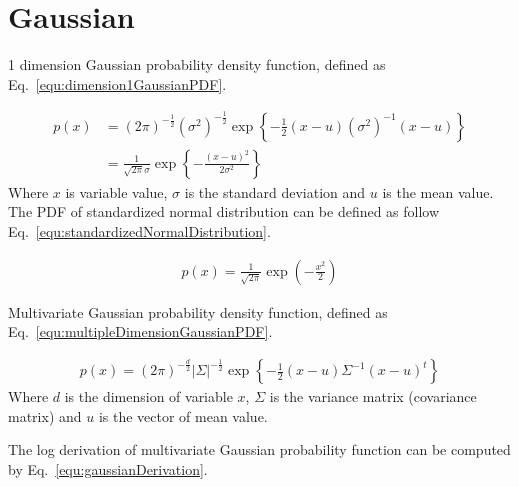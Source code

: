 \documentclass[runningheads,openany]{xhlPaper}
\begin{document}
\section{Gaussian}
1 dimension Gaussian probability density function, defined as Eq.~\ref{equ:dimension1GaussianPDF}.

\begin{equation}
\label{equ:dimension1GaussianPDF}
\begin{aligned}
p\left( x \right) &= {\left( {2\pi } \right)^{ - \frac{1}{2}}}{\left( {{\sigma ^2}} \right)^{ - \frac{1}{2}}}\exp \left\{ { - \frac{1}{2}\left( {x - u} \right){{\left( {{\sigma ^2}} \right)}^{ - 1}}\left( {x - u} \right)} \right\}\\
 &= \frac{1}{{\sqrt {2\pi } \sigma }}\exp \left\{ { - \frac{{{{\left( {x - u} \right)}^2}}}{{2{\sigma ^2}}}} \right\}
\end{aligned}
\end{equation}
Where $x$ is variable value, $\sigma$ is the standard deviation and $u$ is the mean value. The PDF of standardized normal distribution can be defined as follow Eq.~\ref{equ:standardizedNormalDistribution}.

\begin{equation}
\label{equ:standardizedNormalDistribution}
\begin{aligned}
p\left( x \right) = \frac{1}{{\sqrt {2\pi } }}\exp \left( { - \frac{{{x^2}}}{2}} \right)
\end{aligned}
\end{equation}

Multivariate Gaussian probability density function, defined as Eq.~\ref{equ:multipleDimensionGaussianPDF}.

\begin{equation}
\label{equ:multipleDimensionGaussianPDF}
\begin{aligned}
p\left( x \right) = {\left( {2\pi } \right)^{ - \frac{d}{2}}}|\Sigma {|^{ - \frac{1}{2}}}\exp \left\{ { - \frac{1}{2}\left( {x - u} \right){\Sigma ^{ - 1}}{{\left( {x - u} \right)}^t}} \right\}
\end{aligned}
\end{equation}
Where $d$ is the dimension of variable $x$, $\Sigma$ is the variance matrix (covariance matrix) and $u$ is the vector of mean value.

The log derivation of multivariate Gaussian probability function can be computed by Eq.~\ref{equ:gaussianDerivation}.
\end{document}
